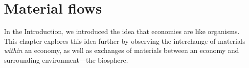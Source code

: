 %
%
%
\chapter{Material flows}
\label{chap:materials} 




In the Introduction, we introduced the idea that economies are like organisms. 
This chapter explores
this idea further by observing the interchange of materials \emph{within}
an economy, as well as exchanges of materials between an economy and 
surrounding environment---the biosphere. 


